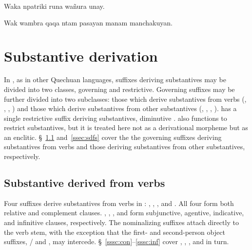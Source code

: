 {%
%
{Waka npatriki runa wañura unay.}%
{}%
{}{}%

%
{Wak wambra qaqa ntam pasayan manam manchakuyan.}%
{}%
{}{}%

\section{Substantive derivation}
In \SYQ, as in other Quechuan languages, suffixes deriving substantives may be divided into two classes, governing and restrictive. Governing suffixes may be further divided into two subclasses: those which derive substantives from verbs (, , , ) and those which derive substantives from other substantives (, , , ). \SYQ{} has a single restrictive suffix deriving substantives, diminutive .  also functions to restrict substantives, but it is treated here not as a derivational morpheme but as an enclitic. §~\ref{ssec:sdfv} and~\ref{ssec:sdfs} cover the the governing suffixes deriving substantives from verbs and those deriving substantives from other substantives, respectively.

\subsection{Substantive derived from verbs}\label{ssec:sdfv}
Four suffixes derive substantives from verbs in \SYQ{}: , , , and . All four form both relative and complement clauses. , , , and  form subjunctive, agentive, indicative, and infinitive clauses, respectively. The nominalizing suffixes attach directly to the verb stem, with the exception that the first- and second-person object suffixes, / and , may intercede. §~\ref{sssc:con}--\ref{sssc:inf} cover , , , and  in turn.

}
